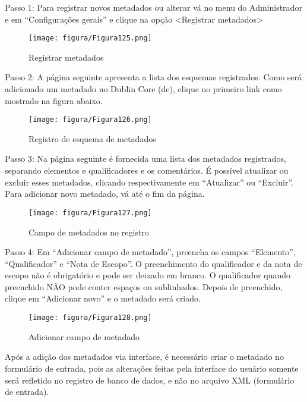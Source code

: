 \documentclass[12pt,hidelinks]{article}
\begin{document}
    Passo 1: Para registrar novos metadados ou alterar vá no menu do Administrador e em “Configurações gerais” e clique na opção <Registrar metadados>
    
    \begin{figure}[!htp]
                \centering
                \texttt{[image: figura/Figura125.png]}
                \caption{Registrar metadados}
            \label{Rotulo}
        \end{figure}
    
    Passo 2: A página seguinte apresenta a lista dos esquemas registrados. Como será adicionado um metadado no Dublin Core (dc), clique no primeiro link como mostrado na figura abaixo.
    
    \begin{figure}[!htp]
                \centering
                \texttt{[image: figura/Figura126.png]}
                \caption{Registro de esquema de metadados}
            \label{Rotulo}
        \end{figure}

\newpage

    Passo 3: Na página seguinte é fornecida uma lista dos metadados registrados, separando elementos e qualificadores e os comentários. É possível atualizar ou excluir esses metadados, clicando respectivamente em “Atualizar” ou “Excluir”. Para adicionar novo metadado, vá até o fim da página.
    
    \begin{figure}[!htp]
                \centering
                \texttt{[image: figura/Figura127.png]}
                \caption{Campo de metadados no registro}
            \label{Rotulo}
        \end{figure}
    
    Passo 4: Em “Adicionar campo de metadado”, preencha os campos “Elemento”, “Qualificador” e “Nota de Escopo”. O preenchimento do qualificador e da nota de escopo não é obrigatório e pode ser deixado em branco. O qualificador quando preenchido NÃO pode conter espaços ou sublinhados. Depois de preenchido, clique em “Adicionar novo” e o metadado será criado.
    
    \begin{figure}[!htp]
                \centering
                \texttt{[image: figura/Figura128.png]}
                \caption{Adicionar campo de metadado}
            \label{Rotulo}
        \end{figure}
    
    Após a adição dos metadados via interface, é necessário criar o metadado no formulário de entrada, pois as alterações feitas pela interface do usuário somente será refletido no registro de banco de dados, e não no arquivo XML (formulário de entrada).
    
\end{document}

